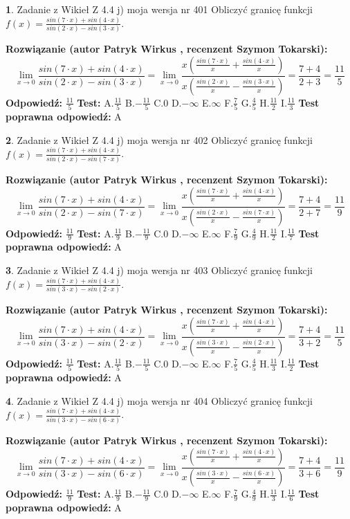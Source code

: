 \documentclass[12pt, a4paper]{article}
\theoremstyle{definition} %
\newtheorem{zad}{}
\newcommand{\zadStart}[1]{\begin{zad}#1\newline}
\newcommand{\zadStop}{\end{zad}}
\newcommand{\rozwStart}[2]{\noindent \textbf{Rozwiązanie (autor #1 , recenzent #2): }\newline}
\newcommand{\rozwStop}{\newline}
\newcommand{\odpStart}{\noindent \textbf{Odpowiedź:}\newline}
\newcommand{\odpStop}{\newline}
\newcommand{\testStart}{\noindent \textbf{Test:}\newline}
\newcommand{\testStop}{\newline}
\newcommand{\kluczStart}{\noindent \textbf{Test poprawna odpowiedź:}\newline}
\newcommand{\kluczStop}{\newline}
\begin{document}
\zadStart{Zadanie z Wikieł Z 4.4 j) moja wersja nr 401}
Obliczyć granicę funkcji $f(x)=\frac{sin(7\cdot x) +sin(4\cdot x)}{sin(2\cdot x) -sin(3\cdot x)}$.
\zadStop
\rozwStart{Patryk Wirkus}{Szymon Tokarski}
$$\lim\limits_{x\to 0}\frac{sin(7\cdot x) +sin(4\cdot x)}{sin(2\cdot x) -sin(3\cdot x)}=\lim\limits_{x\to 0}\frac{x(\frac{sin(7\cdot x)}{x}+\frac{sin(4\cdot x)}{x})}{x(\frac{sin(2\cdot x)}{x}-\frac{sin(3\cdot x)}{x})}=\frac{7+4}{2+3} = \frac{11}{5}$$
\rozwStop
\odpStart
$\frac{11}{5}$
\odpStop
\testStart
A.$\frac{11}{5}$
B.$-\frac{11}{5}$
C.$0$
D.$-\infty$
E.$\infty$
F.$\frac{7}{5}$
G.$\frac{4}{5}$
H.$\frac{11}{2}$
I.$\frac{11}{3}$
\testStop
\kluczStart
A
\kluczStop



\zadStart{Zadanie z Wikieł Z 4.4 j) moja wersja nr 402}
Obliczyć granicę funkcji $f(x)=\frac{sin(7\cdot x) +sin(4\cdot x)}{sin(2\cdot x) -sin(7\cdot x)}$.
\zadStop
\rozwStart{Patryk Wirkus}{Szymon Tokarski}
$$\lim\limits_{x\to 0}\frac{sin(7\cdot x) +sin(4\cdot x)}{sin(2\cdot x) -sin(7\cdot x)}=\lim\limits_{x\to 0}\frac{x(\frac{sin(7\cdot x)}{x}+\frac{sin(4\cdot x)}{x})}{x(\frac{sin(2\cdot x)}{x}-\frac{sin(7\cdot x)}{x})}=\frac{7+4}{2+7} = \frac{11}{9}$$
\rozwStop
\odpStart
$\frac{11}{9}$
\odpStop
\testStart
A.$\frac{11}{9}$
B.$-\frac{11}{9}$
C.$0$
D.$-\infty$
E.$\infty$
F.$\frac{7}{9}$
G.$\frac{4}{9}$
H.$\frac{11}{2}$
I.$\frac{11}{7}$
\testStop
\kluczStart
A
\kluczStop



\zadStart{Zadanie z Wikieł Z 4.4 j) moja wersja nr 403}
Obliczyć granicę funkcji $f(x)=\frac{sin(7\cdot x) +sin(4\cdot x)}{sin(3\cdot x) -sin(2\cdot x)}$.
\zadStop
\rozwStart{Patryk Wirkus}{Szymon Tokarski}
$$\lim\limits_{x\to 0}\frac{sin(7\cdot x) +sin(4\cdot x)}{sin(3\cdot x) -sin(2\cdot x)}=\lim\limits_{x\to 0}\frac{x(\frac{sin(7\cdot x)}{x}+\frac{sin(4\cdot x)}{x})}{x(\frac{sin(3\cdot x)}{x}-\frac{sin(2\cdot x)}{x})}=\frac{7+4}{3+2} = \frac{11}{5}$$
\rozwStop
\odpStart
$\frac{11}{5}$
\odpStop
\testStart
A.$\frac{11}{5}$
B.$-\frac{11}{5}$
C.$0$
D.$-\infty$
E.$\infty$
F.$\frac{7}{5}$
G.$\frac{4}{5}$
H.$\frac{11}{3}$
I.$\frac{11}{2}$
\testStop
\kluczStart
A
\kluczStop



\zadStart{Zadanie z Wikieł Z 4.4 j) moja wersja nr 404}
Obliczyć granicę funkcji $f(x)=\frac{sin(7\cdot x) +sin(4\cdot x)}{sin(3\cdot x) -sin(6\cdot x)}$.
\zadStop
\rozwStart{Patryk Wirkus}{Szymon Tokarski}
$$\lim\limits_{x\to 0}\frac{sin(7\cdot x) +sin(4\cdot x)}{sin(3\cdot x) -sin(6\cdot x)}=\lim\limits_{x\to 0}\frac{x(\frac{sin(7\cdot x)}{x}+\frac{sin(4\cdot x)}{x})}{x(\frac{sin(3\cdot x)}{x}-\frac{sin(6\cdot x)}{x})}=\frac{7+4}{3+6} = \frac{11}{9}$$
\rozwStop
\odpStart
$\frac{11}{9}$
\odpStop
\testStart
A.$\frac{11}{9}$
B.$-\frac{11}{9}$
C.$0$
D.$-\infty$
E.$\infty$
F.$\frac{7}{9}$
G.$\frac{4}{9}$
H.$\frac{11}{3}$
I.$\frac{11}{6}$
\testStop
\kluczStart
A
\kluczStop
\end{document}
